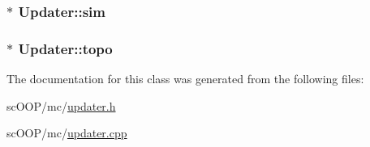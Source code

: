 \hypertarget{class_updater_a0436d5371f3fdc707e323b84ea7356fe}{
\subsubsection[{sim}]{$\ast$ Updater\+::sim\hspace{0.3cm}{\ttfamily [private]}}}\label{class_updater_a0436d5371f3fdc707e323b84ea7356fe}
\hypertarget{class_updater_a2ac7e890d9b19cd1c8074ef5e2b8fd14}{
\subsubsection[{topo}]{$\ast$ Updater\+::topo\hspace{0.3cm}{\ttfamily [private]}}}\label{class_updater_a2ac7e890d9b19cd1c8074ef5e2b8fd14}


The documentation for this class was generated from the following files\+:\begin{DoxyCompactItemize}
\item 
sc\+O\+O\+P/mc/\hyperlink{updater_8h}{updater.\+h}\item 
sc\+O\+O\+P/mc/\hyperlink{updater_8cpp}{updater.\+cpp}\end{DoxyCompactItemize}
